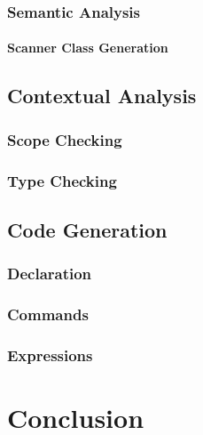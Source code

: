 \subsection{Semantic Analysis}
\subsubsection{Scanner Class Generation}
\section{Contextual Analysis}
\subsection{Scope Checking}
\subsection{Type Checking}
\section{Code Generation}
\subsection{Declaration}
\subsection{Commands}
\subsection{Expressions}

\renewcommand{\ind}[1]{}
\chapter{Conclusion}



\begingroup
	\raggedright
	{}	%
\endgroup


\newpage
\listoffixmes	%

\clearforchapter
\appendix	%


\renewcommand{\ind}[1]{}

